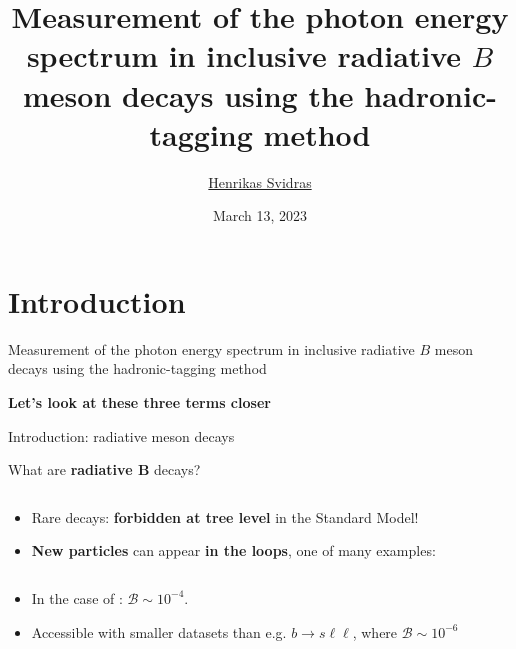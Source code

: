 \documentclass[xcolor=dvipsnames]{beamer}
\title[\meeting]{Measurement of the photon energy spectrum in
inclusive radiative \texorpdfstring{$B$}{B} meson decays using the
hadronic-tagging method} %
\author[Henrikas Svidras]{\texorpdfstring{\footnotesize \underline{Henrikas Svidras}}{Henrikas Svidras}} %
\institute[DESY] %
{
\text{\large \meeting}
\vspace{-10pt}
}
\date{March 13, 2023} %
\begin{document}
{ 
\begin{frame}
\titlepage %
\end{frame}
}
\addtocounter{framenumber}{-1}


\section{Introduction}

\begin{frame}

   \centering

{\LARGE Measurement of the photon energy spectrum in
{\color{OrangeRed}inclusive} {\color{YellowGreen}radiative} \texorpdfstring{$B$}{B} meson decays using the
{\color{MidnightBlue}hadronic-tagging} method}

\vspace{10pt}

\textbf{Let's look at these three terms closer}

\end{frame}

\begin{frame}{Introduction: radiative \safeB meson decays}
\centering\scriptsize
{\normalsize What are \textbf{radiative $\bm{B}$} decays?
\begin{columns}
   
   
\end{columns}
}

\begin{itemize}
   \item Rare decays: \textbf{forbidden at tree level} in the Standard Model!
   \item \textbf{New particles} can appear \textbf{in the loops}, one of many examples:
\end{itemize}
{\normalsize
\begin{columns}
   
\end{columns}
}
\begin{itemize}
   \item In the case of \btosgamma: $\mathcal{B}\sim10^{-4}$.
   \item[\ra] Accessible with smaller datasets than e.g. $b\to s\ell\ell$, where $\mathcal{B}\sim10^{-6}$
\end{itemize}

\end{frame}
\end{document}
